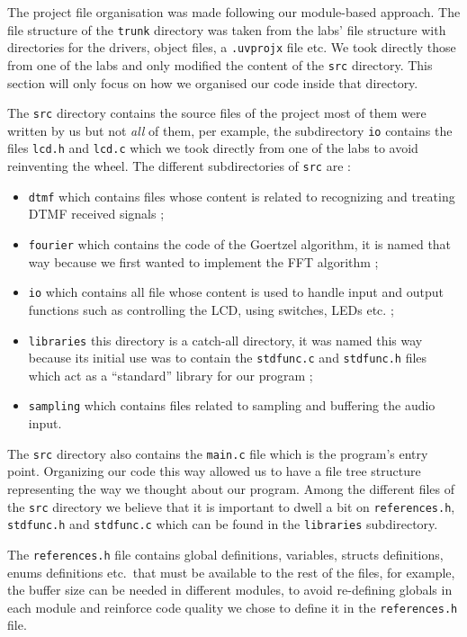 \documentclass{cce2014-design}
\begin{document}
The project file organisation was made following our module-based approach. The
file structure of the \texttt{trunk} directory was taken from the labs' file
structure with directories for the drivers, object files, a \texttt{.uvprojx}
file etc. We took directly those from one of the labs and only modified the
content of the \texttt{src} directory. This section will only focus on how we
organised our code inside that directory.

The \texttt{src} directory contains the source files of the project most of them
were written by us but not \textit{all} of them, per example, the subdirectory
\texttt{io} contains the files \texttt{lcd.h} and \texttt{lcd.c} which we took
directly from one of the labs to avoid reinventing the wheel. The different
subdirectories of \texttt{src} are :
\begin{itemize}
    \item \texttt{dtmf} which contains files whose content is related to
        recognizing and treating DTMF received signals ;
	\item \texttt{fourier} which contains the code of the Goertzel algorithm,
        it is named that way because we first wanted to implement the FFT
        algorithm ;
	\item \texttt{io} which contains all file whose content is used to handle
        input and output functions such as controlling the LCD, using switches,
        LEDs etc. ;
	\item \texttt{libraries} this directory is a catch-all directory, it was
        named this way because its initial use was to contain the
        \texttt{stdfunc.c} and \texttt{stdfunc.h} files which act as a
        ``standard'' library for our program ;
	\item \texttt{sampling} which contains files related to sampling and
        buffering the audio input.
\end{itemize}
The \texttt{src} directory also contains the \texttt{main.c} file which is the
program's entry point. Organizing our code this way allowed us to have a file
tree structure representing the way we thought about our program. Among the
different files of the \texttt{src} directory we believe that it is important to
dwell a bit on \texttt{references.h}, \texttt{stdfunc.h} and \texttt{stdfunc.c}
which can be found in the \texttt{libraries} subdirectory.

The \texttt{references.h} file contains global definitions, variables, structs
definitions, enums definitions etc.\ that must be available to the rest of the
files, for example, the buffer size can be needed in different modules, to avoid
re-defining globals in each module and reinforce code quality we chose to define
it in the \texttt{references.h} file. 
\end{document}

